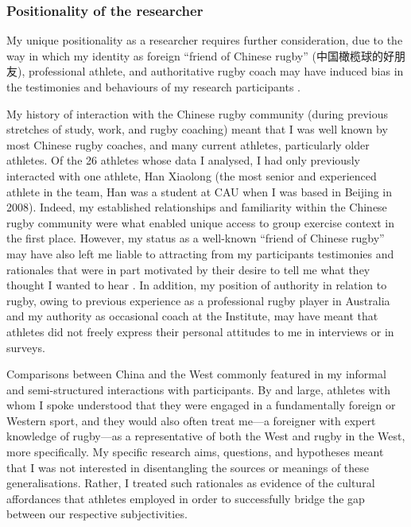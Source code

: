 \begin{CJK}{UTF8}{gbsn}
 

 \subsubsection{Positionality of the researcher}
 My unique positionality as a researcher requires further consideration, due to the way in which my identity as foreign ``friend of Chinese rugby'' (中国橄榄球的好朋友), professional athlete, and authoritative rugby coach may have induced bias in the testimonies and behaviours of my research participants \citep[referred to in experimental psychology as ``demand characteristics;'' see][]{McCambridge2012}.

 My history of interaction with the Chinese rugby community (during previous stretches of study, work, and rugby coaching) meant that I was well known by most Chinese rugby coaches, and many current athletes, particularly older athletes.  Of the 26 athletes whose data I analysed, I had only previously interacted with one athlete, Han Xiaolong (the most senior and experienced athlete in the team, Han was a student at CAU when I was based in Beijing in 2008).  Indeed, my established relationships and familiarity within the Chinese rugby community were what enabled unique access to group exercise context in the first place.  However, my status as a well-known ``friend of Chinese rugby'' may have also left me liable to attracting from my participants testimonies and rationales that were in part motivated by their desire to tell me what they thought I wanted to hear \citep{Clifford1986}.  In addition, my position of authority in relation to rugby, owing to previous experience as a professional rugby player in Australia and my authority as occasional coach at the Institute, may have meant that athletes did not freely express their personal attitudes to me in interviews or in surveys.

 Comparisons between China and the West commonly featured in my informal and semi-structured interactions with participants.  By and large, athletes with whom I spoke understood that they were engaged in a fundamentally foreign or Western sport, and they would also often treat me---a foreigner with expert knowledge of rugby---as a representative of both the West and rugby in the West, more specifically.  My specific research aims, questions, and hypotheses meant that I was not interested in disentangling the sources or meanings of these generalisations.  Rather, I treated such rationales as evidence of the cultural affordances that athletes employed in order to successfully bridge the gap between our respective subjectivities.


\end{CJK}
